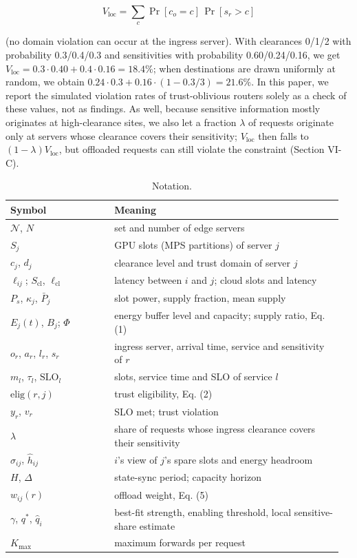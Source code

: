 \documentclass[journal]{IEEEtran}
\begin{document}
\begin{equation}
V_\mathrm{loc}=\sum_{c} \Pr[c_{o}=c]\,\Pr[s_r>c]
\end{equation}

(no domain violation can occur at the ingress server). With clearances 0/1/2 with probability 0.3/0.4/0.3 and sensitivities with probability 0.60/0.24/0.16, we get \(V_\mathrm{loc}=0.3\cdot0.40+0.4\cdot0.16=18.4\%\); when destinations are drawn uniformly at random, we obtain \(0.24\cdot0.3+0.16\cdot(1-0.3/3)=21.6\%\). In this paper, we report the simulated violation rates of trust-oblivious routers solely as a check of these values, not as findings. As well, because sensitive information mostly originates at high-clearance sites, we also let a fraction \(\lambda\) of requests originate only at servers whose clearance covers their sensitivity; \(V_\mathrm{loc}\) then falls to \((1-\lambda)V_\mathrm{loc}\), but offloaded requests can still violate the constraint (Section VI-C).

\begin{table}[!t]
\centering
\caption{Notation.}
\footnotesize
\begin{tabular}{@{}p{0.3\linewidth}p{0.66\linewidth}@{}}
\toprule
Symbol & Meaning \\
\midrule
\(\mathcal N\), \(N\) & set and number of edge servers \\
\(S_j\) & GPU slots (MPS partitions) of server \(j\) \\
\(c_j\), \(d_j\) & clearance level and trust domain of server \(j\) \\
\(\ell_{ij}\); \(S_\mathrm{cl}\), \(\ell_\mathrm{cl}\) & latency between \(i\) and \(j\); cloud slots and latency \\
\(P_s\), \(\kappa_j\), \(\bar P_j\) & slot power, supply fraction, mean supply \\
\(E_j(t)\), \(B_j\); \(\Phi\) & energy buffer level and capacity; supply ratio, Eq. (1) \\
\(o_r\), \(a_r\), \(l_r\), \(s_r\) & ingress server, arrival time, service and sensitivity of \(r\) \\
\(m_l\), \(\tau_l\), \(\mathrm{SLO}_l\) & slots, service time and SLO of service \(l\) \\
\(\mathrm{elig}(r,j)\) & trust eligibility, Eq. (2) \\
\(y_r\), \(v_r\) & SLO met; trust violation \\
\(\lambda\) & share of requests whose ingress clearance covers their sensitivity \\
\(\hat\sigma_{ij}\), \(\hat h_{ij}\) & \(i\)'s view of \(j\)'s spare slots and energy headroom \\
\(H\), \(\Delta\) & state-sync period; capacity horizon \\
\(w_{ij}(r)\) & offload weight, Eq. (5) \\
\(\gamma\), \(q^\ast\), \(\hat q_i\) & best-fit strength, enabling threshold, local sensitive-share estimate \\
\(K_{\max}\) & maximum forwards per request \\
\bottomrule
\end{tabular}
\end{table}
\end{document}
